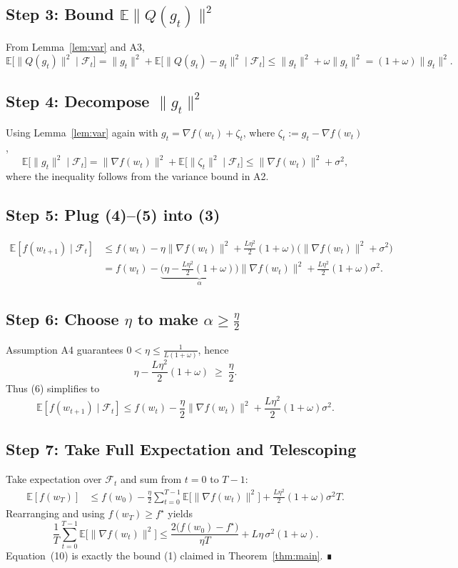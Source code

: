 \documentclass{article}
\begin{document}
\subsection*{Step 3: Bound $\mathbb{E}\|Q(g_t)\|^2$}
From Lemma~\ref{lem:var} and A3,
\[
\mathbb{E}\!\big[\|Q(g_t)\|^2\mid\mathcal{F}_t\big]
   = \|g_t\|^2 + \mathbb{E}\!\big[\|Q(g_t)-g_t\|^2\mid\mathcal{F}_t\big]
   \le \|g_t\|^2 + \omega\|g_t\|^2
   = (1+\omega)\|g_t\|^2 .
\tag{4}
\]

\subsection*{Step 4: Decompose $\|g_t\|^2$}
Using Lemma~\ref{lem:var} again with $g_t=\nabla f(w_t)+\zeta_t$, where $\zeta_t:=g_t-\nabla f(w_t)$,
\[
\mathbb{E}\!\big[\|g_t\|^2\mid\mathcal{F}_t\big]
   = \|\nabla f(w_t)\|^2 + \mathbb{E}\!\big[\|\zeta_t\|^2\mid\mathcal{F}_t\big]
   \le \|\nabla f(w_t)\|^2 + \sigma^2 ,
\tag{5}
\]
where the inequality follows from the variance bound in A2.

\subsection*{Step 5: Plug (4)–(5) into (3)}
\[
\begin{aligned}
\mathbb{E}[f(w_{t+1})\mid\mathcal{F}_t]
&\le f(w_t) -\eta\|\nabla f(w_t)\|^2
   + \frac{L\eta^2}{2}(1+\omega)\big(\|\nabla f(w_t)\|^2+\sigma^2\big) \\[4pt]
&= f(w_t) -\underbrace{\Big(\eta - \frac{L\eta^2}{2}(1+\omega)\Big)}_{\displaystyle\alpha}
      \|\nabla f(w_t)\|^2
   + \frac{L\eta^2}{2}(1+\omega)\sigma^2 .
\end{aligned}
\tag{6}
\]

\subsection*{Step 6: Choose $\eta$ to make $\alpha\ge\frac{\eta}{2}$}
Assumption A4 guarantees $0<\eta\le\frac{1}{L(1+\omega)}$, hence
\[
\eta - \frac{L\eta^2}{2}(1+\omega) 
\;\ge\; \frac{\eta}{2} .
\tag{7}
\]
Thus (6) simplifies to
\[
\mathbb{E}[f(w_{t+1})\mid\mathcal{F}_t]
\le f(w_t) - \frac{\eta}{2}\|\nabla f(w_t)\|^2
    + \frac{L\eta^2}{2}(1+\omega)\sigma^2 .
\tag{8}
\]

\subsection*{Step 7: Take Full Expectation and Telescoping}
Take expectation over $\mathcal{F}_t$ and sum from $t=0$ to $T-1$:
\[
\begin{aligned}
\mathbb{E}[f(w_T)]
&\le f(w_0) - \frac{\eta}{2}\sum_{t=0}^{T-1}\mathbb{E}\!\big[\|\nabla f(w_t)\|^2\big]
   + \frac{L\eta^2}{2}(1+\omega)\sigma^2 T .
\end{aligned}
\tag{9}
\]
Rearranging and using $f(w_T)\ge f^\star$ yields
\[
\frac{1}{T}\sum_{t=0}^{T-1}\mathbb{E}\!\big[\|\nabla f(w_t)\|^2\big]
\le
\frac{2\big(f(w_0)-f^\star\big)}{\eta T}
   + L\eta\,\sigma^2(1+\omega) .
\tag{10}
\]
Equation~(10) is exactly the bound (1) claimed in Theorem~\ref{thm:main}. ∎
\end{document}
